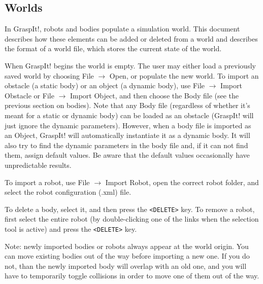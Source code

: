 \subsection{Worlds}

In GraspIt!, robots and bodies populate a simulation world. This
document describes how these elements can be added or deleted from a
world and describes the format of a world file, which stores the
current state of the world.

When GraspIt! begins the world is empty. The user may either load a
previously saved world by choosing File $\rightarrow$ Open, or
populate the new world. To import an obstacle (a static body) or an
object (a dynamic body), use File $\rightarrow$ Import Obstacle or
File $\rightarrow$ Import Object, and then choose the Body file (see
the previous section on bodies). Note that any Body file (regardless
of whether it's meant for a static or dynamic body) can be loaded as
an obstacle (GraspIt! will just ignore the dynamic
parameters). However, when a body file is imported as an Object,
GraspIt! will automatically instantiate it as a dynamic body. It will
also try to find the dynamic parameters in the body file and, if it
can not find them, assign default values. Be aware that the default
values occasionally have unpredictable results.

To import a robot, use File $\rightarrow$ Import Robot, open the
correct robot folder, and select the robot configuration (.xml) file.

To delete a body, select it, and then press the \texttt{<DELETE>} key. To
remove a robot, first select the entire robot (by double-clicking one
of the links when the selection tool is active) and press the \texttt{<DELETE>}
key.

Note: newly imported bodies or robots always appear at the world
origin. You can move existing bodies out of the way before importing a
new one. If you do not, than the newly imported body will overlap with
an old one, and you will have to temporarily toggle collisions in
order to move one of them out of the way.

